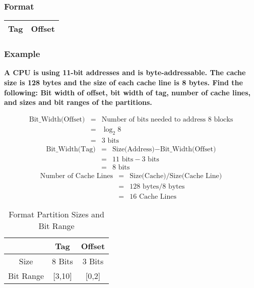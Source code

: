 \documentclass[11pt]{article}
\begin{document}
\subsubsection{Format}

\begin{table}[H]
	\centering
	\begin{tabular}{| c | c |}
		\hline
		Tag			&		 Offset\\
		\hline
	\end{tabular}
\end{table}

\subsubsection{Example}

\textbf{A CPU is using 11-bit addresses and is byte-addressable. The cache size is 128 bytes and the size of each cache line is 8 bytes. Find the following: Bit width of offset, bit width of tag, number of cache lines, and sizes and bit ranges of the partitions.}

\begin{eqnarray*}
	\text{Bit\_Width(Offset)} &=& \text{Number of bits needed to address 8 blocks}\\
	&=& \log_2 8\\
	&=& 3 \text{ bits}
\end{eqnarray*}
\begin{eqnarray*}
	\text{Bit\_Width(Tag)} &=& \text{Size(Address)} - \text{Bit\_Width(Offset)}\\
	&=& 11 \text{ bits} - 3 \text{ bits}\\
	&=& 8 \text{ bits}
\end{eqnarray*}
\begin{eqnarray*}
	\text{Number of Cache Lines} &=& \text{Size(Cache)} / \text{Size(Cache Line)}\\
	&=& 128 \text{ bytes} / 8 \text{ bytes}\\
	&=& 16 \text{ Cache Lines}
\end{eqnarray*}

\begin{table}[H]
	\centering
	\caption*{Format Partition Sizes and Bit Range}
	\begin{tabular}{| c | c | c |}
		\hline
		&	Tag		&	Offset\\
		\hline
		Size		&	8 Bits		&	3 Bits\\
		\hline
		Bit Range	&	[3,10]	&	[0,2]\\
		\hline
	\end{tabular}
\end{table}
\end{document}
